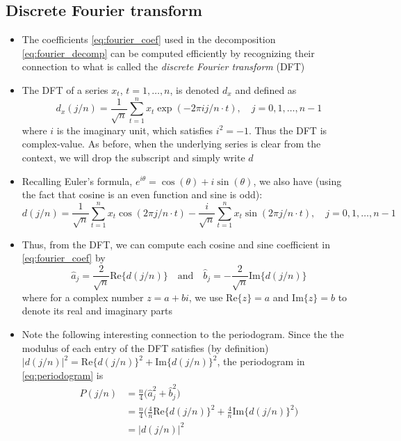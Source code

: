 \documentclass{article}
\begin{document}
\subsection{Discrete Fourier transform}

\begin{itemize}
\item The coefficients \eqref{eq:fourier_coef} used in the decomposition
  \eqref{eq:fourier_decomp} can be computed efficiently by recognizing their
  connection to what is called the \emph{discrete Fourier transform} (DFT) 

\item The DFT of a series $x_t$, $t = 1,\dots,n$, is denoted $d_x$ and defined
  as  
  \begin{equation}
  \label{eq:dft}
  d_x(j/n) = \frac{1}{\sqrt{n}} \sum_{t=1}^n x_t \exp(-2\pi i j/n \cdot t), 
  \quad j = 0,1,\dots,n-1 
  \end{equation}
  where $i$ is the imaginary unit, which satisfies $i^2 = -1$. Thus the DFT is
  complex-value. As before, when the underlying series is clear from the
  context, we will drop the subscript and simply write $d$ 

\item Recalling Euler's formula, $e^{i\theta} = \cos(\theta) + i \sin(\theta)$, 
  we also have (using the fact that cosine is an even function and sine is odd): 
  \[
  d(j/n) = \frac{1}{\sqrt{n}} \sum_{t=1}^n x_t \cos(2\pi j/n \cdot t) - 
  \frac{i}{\sqrt{n}} \sum_{t=1}^n x_t \sin(2\pi j/n \cdot t), \quad j =
  0,1,\dots,n-1   
  \]

\item Thus, from the DFT, we can compute each cosine and sine coefficient in
  \eqref{eq:fourier_coef} by
  \[
  \hat{a}_j = \frac{2}{\sqrt{n}} \mathrm{Re}\{d(j/n)\} \quad \text{and} \quad 
  \hat{b}_j = -\frac{2}{\sqrt{n}} \mathrm{Im}\{d(j/n)\}
  \]
  where for a complex number $z = a+bi$, we use $\mathrm{Re}\{z\} = a$ and
  $\mathrm{Im}\{z\} = b$ to denote its real and imaginary parts

\item Note the following interesting connection to the periodogram. Since the
  the modulus of each entry of the DFT satisfies (by definition) $|d(j/n)|^2 = 
  \mathrm{Re}\{d(j/n)\}^2 + \mathrm{Im}\{d(j/n)\}^2$, the periodogram in
  \eqref{eq:periodogram} is 
  \begin{align}
  \nonumber
  P(j/n) &= \frac{n}{4} \big( \hat{a}_j^2 + \hat{b}_j^2 \big) \\
  \nonumber
  &= \frac{n}{4} \bigg( \frac{4}{n} \mathrm{Re}\{d(j/n)\}^2 +
    \frac{4}{n} \mathrm{Im}\{d(j/n)\}^2 \bigg) \\
  \label{eq:periodogram_dft}          
  &= |d(j/n)|^2
  \end{align}


\end{itemize}
\end{document}

